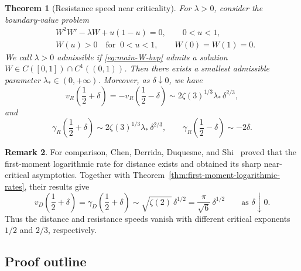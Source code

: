 \documentclass[12pt,preprint]{amsart}
\numberwithin{equation}{section}
\theoremstyle{plain}
\newtheorem{theorem}{Theorem}[section]
\theoremstyle{definition}
\newtheorem{remark}[theorem]{Remark}
\begin{document}
\begin{theorem}[Resistance speed near criticality]
\label{thm:near-critical-speed}
For $\lambda>0$, consider the boundary-value problem
\begin{equation}
\begin{aligned}
 &W^2W'-\lambda W+u(1-u)=0,\qquad 0<u<1,\\
 &W(u)>0\quad\text{for }\ 0<u<1, \qquad
 W(0)=W(1)=0.
\end{aligned}
 \label{eq:main-W-bvp}
\end{equation}
We call $\lambda>0$ \emph{admissible} if \eqref{eq:main-W-bvp} admits a solution
$W\in C([0,1])\cap C^1((0,1))$.
Then there exists a smallest admissible parameter
$\lambda_*\in (0, +\infty)$.   Moreover, as
$\delta\downarrow0$, we have
\begin{equation}
 v_R\left(\frac12+\delta\right)
 =-v_R\left(\frac12-\delta\right)
 \sim2\zeta(3)^{1/3}\lambda_*\,\delta^{2/3},
 \label{eq:main-near-critical-limit}
\end{equation}
and
\begin{equation}
 \gamma_R\left(\frac12+\delta\right)
 \sim2\zeta(3)^{1/3}\lambda_*\,\delta^{2/3},
 \qquad
 \gamma_R\left(\frac12-\delta\right)\sim-2\delta.
 \label{eq:resistance-first-moment-near-critical}
\end{equation}
\end{theorem}

\begin{remark}
For comparison, Chen, Derrida, Duquesne, and
Shi~\cite[equation~(1.2) and Theorem~1]{ChenDerridaDuquesneShi2026} proved
that the first-moment logarithmic rate for distance exists and obtained its
sharp
near-critical asymptotics.  Together with
Theorem~\ref{thm:first-moment-logarithmic-rates}, their results give
\begin{equation*}
 v_D\left(\frac12+\delta\right)=\gamma_D\left(\frac12+\delta\right)
 \sim \sqrt{\zeta(2)}\,\delta^{1/2}
 =\frac{\pi}{\sqrt6}\,\delta^{1/2}
 \qquad\text{as }\delta\downarrow0.
\end{equation*}
Thus the distance and resistance speeds vanish with different critical
exponents $1/2$ and $2/3$, respectively.  
\end{remark}

\subsection{Proof outline}
\end{document}
